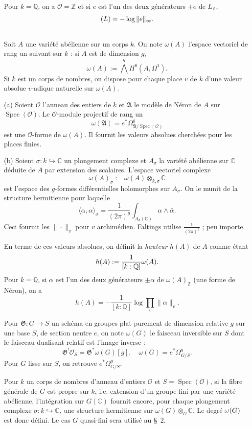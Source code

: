 \documentclass[12pt,a4paper]{article}
\theoremstyle{plain}
\theoremstyle{definition}
\theoremstyle{remark}
\DeclareMathOperator{\Spec}{Spec}
\newcommand{\CC}{\mathbb{C}}
\newcommand{\QQ}{\mathbb{Q}}
\newcommand{\ZZ}{\mathbb{Z}}
\newcommand{\cO}{\mathcal{O}}
\newcommand{\fA}{\mathfrak{A}}
\let\deg\relax
\providecommand{\CC}{\mathbb{C}}
\providecommand{\QQ}{\mathbb{Q}}
\providecommand{\ZZ}{\mathbb{Z}}
\providecommand{\cO}{\mathcal{O}}
\providecommand{\fA}{\mathfrak{A}}
\providecommand{\fG}{\mathfrak{G}}
\providecommand{\Spec}{\operatorname{Spec}}
\begin{document}
Pour $k = \QQ$, on a $\cO = \ZZ$ et si $e$ est l'un des deux générateurs $\pm e$ de $L_{\ZZ}$,
\[
\deg(L) = -\log \|e\|_\infty.
\]

\subsection{}

Soit $A$ une variété abélienne sur un corps $k$. On note $\omega(A)$ l'espace vectoriel de rang un suivant sur $k$ : si $A$ est de dimension $g$,
\[
\omega(A) := \overset{g}{\bigwedge} H^0(A, \Omega^1).
\]
Si $k$ est un corps de nombres, on dispose pour chaque place $v$ de $k$ d'une valeur absolue $v$-adique naturelle sur $\omega(A)$.

(a) Soient $\cO$ l'anneau des entiers de $k$ et $\fA$ le modèle de Néron de $A$ sur $\Spec(\cO)$. Le $\cO$-module projectif de rang un
\[
\omega(\fA) = e^* \Omega^g_{\fA/\Spec(\cO)}
\]
est une $\cO$-forme de $\omega(A)$. Il fournit les valeurs absolues cherchées pour les places finies.

(b) Soient $\sigma : k \hookrightarrow \CC$ un plongement complexe et $A_\sigma$ la variété abélienne sur $\CC$ déduite de $A$ par extension des scalaires. L'espace vectoriel complexe
\[
\omega(A)_\sigma := \omega(A) \otimes_{k,\sigma} \CC
\]
est l'espace des $g$-formes différentielles holomorphes sur $A_\sigma$. On le munit de la structure hermitienne pour laquelle
\[
\langle \alpha, \alpha \rangle_\sigma = \frac{1}{(2\pi)^g} \int_{A_\sigma(\CC)} \alpha \wedge \bar{\alpha}.
\]
Ceci fournit les $\|\cdot\|_v$ pour $v$ archimédien. Faltings utilise $\frac{1}{(2\pi)^g}$ ; peu importe.

En terme de ces valeurs absolues, on définit la \emph{hauteur} $h(A)$ de $A$ comme étant
\[
h(A) := \frac{1}{[k:\QQ]} \deg \omega(A).
\]
Pour $k = \QQ$, si $\alpha$ est l'un des deux générateurs $\pm \alpha$ de $\omega(A)_{\ZZ}$ (une forme de Néron), on a
\[
h(A) = -\frac{1}{[k:\QQ]} \log \prod_v \|\alpha\|_v.
\]

Pour $\fG : G \to S$ un schéma en groupes plat purement de dimension relative $g$ sur une base $S$, de section neutre $e$, on note $\omega(G)$ le faisceau inversible sur $S$ dont le faisceau dualisant relatif est l'image inverse :
\[
\fG^! \cO_S = \fG^* \omega(G)[g], \quad \omega(G) = e^* \Omega^g_{G/S}.
\]
Pour $G$ lisse sur $S$, on retrouve $e^* \Omega^g_{G/S}$.

Pour $k$ un corps de nombres d'anneau d'entiers $\cO$ et $S = \Spec(\cO)$, si la fibre générale de $G$ est propre sur $k$, i.e. extension d'un groupe fini par une variété abélienne, l'intégration sur $G(\CC)$ fournit encore, pour chaque plongement complexe $\sigma : k \hookrightarrow \CC$, une structure hermitienne sur $\omega(G) \otimes_{\cO} \CC$. Le degré $\deg \omega(G)$ est donc défini. Le cas $G$ quasi-fini sera utilisé au §~2.
\end{document}
